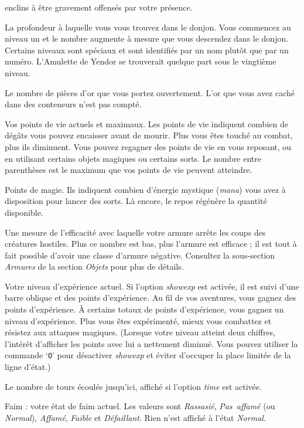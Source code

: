 \documentclass[titlepage]{article}
\begin{document}
\begin{description}
enclins à être gravement offensés par votre présence.
\item[Niveau du donjon]
La profondeur à laquelle vous vous trouvez dans le donjon.  Vous commencez au
niveau un et le nombre augmente à mesure que vous descendez dans le donjon.
Certains niveaux sont spéciaux et sont identifiés par un nom plutôt que par un
numéro.  L'Amulette de Yendor se trouverait quelque part sous le vingtième
niveau.
\item[Or]
Le nombre de pièces d'or que vous portez ouvertement.  L'or que vous avez
caché dans des conteneurs n'est pas compté.
\item[Points de vie]
Vos points de vie actuels et maximaux.  Les points de vie indiquent combien
de dégâts vous pouvez encaisser avant de mourir.  Plus vous êtes touché au
combat, plus ils diminuent.  Vous pouvez regagner des points de vie en vous
reposant, ou en utilisant certains objets magiques ou certains sorts.  Le
nombre entre parenthèses est le maximum que vos points de vie peuvent atteindre.
\item[Pouvoir]
Points de magie.  Ils indiquent combien d'énergie mystique (\textit{mana})
vous avez à disposition pour lancer des sorts.  Là encore, le repos régénère
la quantité disponible.
\item[Classe d'armure]
Une mesure de l'efficacité avec laquelle votre armure arrête les coups des
créatures hostiles.  Plus ce nombre est bas, plus l'armure est efficace ; il est
tout à fait possible d'avoir une classe d'armure négative.
Consultez la sous-section \textit{Armures} de la section \textit{Objets} pour plus de détails.
\item[Expérience]
Votre niveau d'expérience actuel.
Si l'option \textit{showexp}
est activée, il est suivi d'une barre oblique et des points d'expérience.
Au fil de vos aventures, vous gagnez des points d'expérience.
À certains totaux de points d'expérience, vous gagnez un niveau d'expérience.
Plus vous êtes expérimenté, mieux vous combattez et résistez aux attaques
magiques.
(Lorsque votre niveau atteint deux chiffres, l'intérêt d'afficher les points
avec lui a nettement diminué.
Vous pouvez utiliser la commande `\texttt{O}' pour désactiver \textit{showexp}
et éviter d'occuper la place limitée de la ligne d'état.)
\item[Temps]
Le nombre de tours écoulés jusqu'ici, affiché si l'option
\textit{time} est activée.
\item[État]
Faim :
votre état de faim actuel.
Les valeurs sont \textit{Rassasié}, \textit{Pas~affamé} (ou \textit{Normal}),
\textit{Affamé}, \textit{Faible} et \textit{Défaillant}.
Rien n'est affiché à l'état \textit{Normal}.


\end{description}
\end{document}

